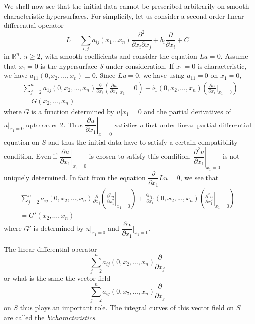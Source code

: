 We shall now see that the initial data cannot be prescribed arbitrarily on smooth characteristic hypersurfaces. For simplicity, let us consider a second order linear differential operator
$$
L=\sum\limits_{i,j}a_{ij}(x_{1}\ldots x_{n})\frac{\partial^{2}}{\partial x_{i}\partial x_{j}}+b_{i}\frac{\partial}{\partial x_{i}}+C
$$
in $\mathbb{R}^{n}$, $n\geq 2$, with smooth coefficients and consider the equation $Lu=0$. Assume that $x_{1}=0$ is the hypersurface $S$ under consideration. If $x_{1}=0$ is characteristic, we have $a_{11}(0,x_{2},\ldots,x_{n})\equiv 0$. Since $Lu=0$, we have using $a_{11}=0$ on $x_{1}=0$,
\begin{align*}
& \sum\limits^{n}_{j=2}a_{1j}(0,x_{2},\ldots,x_{n})\frac{\partial}{\partial x_{j}}\left(\frac{\partial u}{\partial x_{1}}\big|_{x_{1}}=0\right)+b_{1}(0,x_{2},\ldots,x_{n})\left(\frac{\partial u}{\partial x_{1}}\big|_{x_{1}=0}\right)\\[3pt]
& = G(x_{2},\ldots,x_{n})
\end{align*}
where $G$ is a function determined by $u|x_{1}=0$ and the partial derivatives of $u|_{x_{1}=0}$ upto order 2. Thus $\left.\dfrac{\partial u}{\partial x_{1}}\right|_{x_{1}=0}$ satisfies a first order linear partial differential equation on $S$ and thus the initial data have to satisfy a certain compatibility condition. Even if $\left.\dfrac{\partial u}{\partial x_{1}}\right|_{x_{1}=0}$ is chosen to satisfy this condition, $\left.\dfrac{\partial^{2}u}{\partial x_{1}}\right|_{x_{1}=0}$ is not uniquely determined. In fact from the equation $\dfrac{\partial}{\partial x_{1}}Lu=0$, we see that
\begin{gather*}
\sum\limits_{j=2}^{n}a_{ij}(0,x_{2},\ldots,x_{n})\frac{\partial}{\partial x_{j}}\left(\left.\frac{\partial^{2}u}{\partial x^{2}_{1}}\right|_{x_{1}=0}\right)+\frac{\partial a_{11}}{\partial x_{1}}(0,x_{2},\ldots,x_{n})\left(\left.\frac{\partial^{2}u}{\partial x^{2}_{1}}\right|_{x_{1}=0}\right)\\[3pt]
=G'(x_{2},\ldots,x_{n})
\end{gather*}\pageoriginale
where $G'$ is determined by $u\big|_{x_{1}=0}$ and $\dfrac{\partial u}{\partial x_{1}}\big|_{x_{1}=0}$.

The linear differential operator
$$
\sum\limits^{n}_{j=2}a_{ij}(0,x_{2},\ldots,x_{n})\dfrac{\partial}{\partial x_{j}}
$$
or what is the same the vector field
$$
\sum\limits^{n}_{j=2}a_{ij}(0,x_{2},\ldots,x_{n})\dfrac{\partial}{\partial x_{j}}
$$
on $S$ thus plays an important role. The integral curves of this vector field on $S$ are called the {\em bicharacteristics}.

